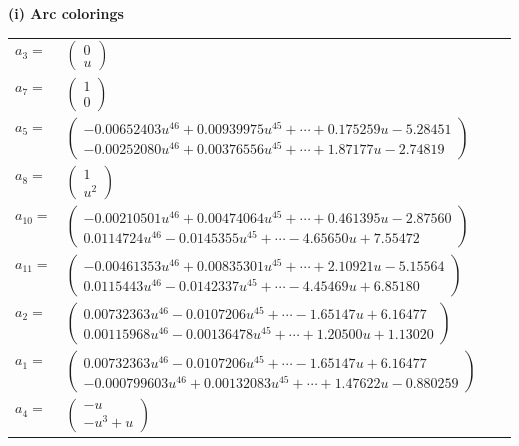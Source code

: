 \documentclass[1p]{elsarticle_modified}
\theoremstyle{definition}
\begin{document}
\flushleft \textbf{(i) Arc colorings}\\
\begin{tabular}{m{7pt} m{180pt} m{7pt} m{180pt} }
\flushright $a_{3}=$&$\begin{pmatrix}0\\u\end{pmatrix}$ \\
\flushright $a_{7}=$&$\begin{pmatrix}1\\0\end{pmatrix}$ \\
\flushright $a_{5}=$&$\begin{pmatrix}-0.00652403 u^{46}+0.00939975 u^{45}+\cdots+0.175259 u-5.28451\\-0.00252080 u^{46}+0.00376556 u^{45}+\cdots+1.87177 u-2.74819\end{pmatrix}$ \\
\flushright $a_{8}=$&$\begin{pmatrix}1\\u^2\end{pmatrix}$ \\
\flushright $a_{10}=$&$\begin{pmatrix}-0.00210501 u^{46}+0.00474064 u^{45}+\cdots+0.461395 u-2.87560\\0.0114724 u^{46}-0.0145355 u^{45}+\cdots-4.65650 u+7.55472\end{pmatrix}$ \\
\flushright $a_{11}=$&$\begin{pmatrix}-0.00461353 u^{46}+0.00835301 u^{45}+\cdots+2.10921 u-5.15564\\0.0115443 u^{46}-0.0142337 u^{45}+\cdots-4.45469 u+6.85180\end{pmatrix}$ \\
\flushright $a_{2}=$&$\begin{pmatrix}0.00732363 u^{46}-0.0107206 u^{45}+\cdots-1.65147 u+6.16477\\0.00115968 u^{46}-0.00136478 u^{45}+\cdots+1.20500 u+1.13020\end{pmatrix}$ \\
\flushright $a_{1}=$&$\begin{pmatrix}0.00732363 u^{46}-0.0107206 u^{45}+\cdots-1.65147 u+6.16477\\-0.000799603 u^{46}+0.00132083 u^{45}+\cdots+1.47622 u-0.880259\end{pmatrix}$ \\
\flushright $a_{4}=$&$\begin{pmatrix}- u\\- u^3+u\end{pmatrix}$ \\

\end{tabular}
\end{document}
